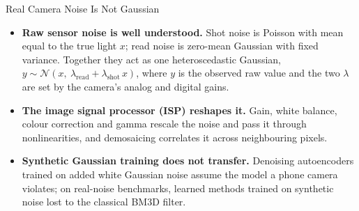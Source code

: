 \begin{frame}{Real Camera Noise Is Not Gaussian}
  \begin{center}
  \end{center}
  \vspace{-0.6em}
  \begin{itemize}\footnotesize\itemsep0.3em
    \item \textbf{Raw sensor noise is well understood.} Shot noise is Poisson with mean equal to the true light $x$; read noise is zero-mean Gaussian with fixed variance. Together they act as one heteroscedastic Gaussian, $y \sim \mathcal{N}(x,\ \lambda_{\text{read}} + \lambda_{\text{shot}}\,x)$, where $y$ is the observed raw value and the two $\lambda$ are set by the camera's analog and digital gains.
    \item \textbf{The image signal processor (ISP) reshapes it.} Gain, white balance, colour correction and gamma rescale the noise and pass it through nonlinearities, and demosaicing correlates it across neighbouring pixels.
    \item \textbf{Synthetic Gaussian training does not transfer.} Denoising autoencoders trained on added white Gaussian noise assume the model a phone camera violates; on real-noise benchmarks, learned methods trained on synthetic noise lost to the classical BM3D filter.

\end{itemize}
\end{frame}
